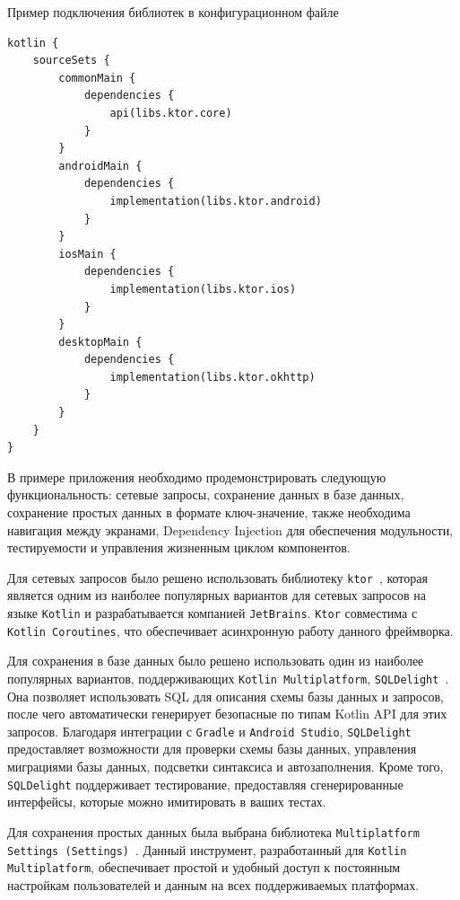\documentclass[14pt, russian]{scrartcl}
\begin{document}
\begin{listing}[!htb]
\caption{Пример подключения библиотек в конфигурационном файле}
\label{lst:apply-lib}
\begin{verbatim}
kotlin {
    sourceSets {
        commonMain {
            dependencies {
                api(libs.ktor.core)
            }
        }
        androidMain {
            dependencies {
                implementation(libs.ktor.android)
            }
        }
        iosMain {
            dependencies {
                implementation(libs.ktor.ios)
            }
        }
        desktopMain {
            dependencies {
                implementation(libs.ktor.okhttp)
            }
        }
    }
}
\end{verbatim}
\end{listing}

В примере приложения необходимо продемонстрировать следующую функциональность: сетевые запросы, сохранение данных в базе данных, сохранение простых данных в формате ключ-значение, также необходима навигация между экранами, Dependency Injection для обеспечения модульности, тестируемости и управления жизненным циклом компонентов.

Для сетевых запросов было решено использовать библиотеку \texttt{ktor}~\cite{ktor}, которая является одним из наиболее популярных вариантов для сетевых запросов на языке \texttt{Kotlin} и разрабатывается компанией \texttt{JetBrains}. \texttt{Ktor} совместима с \texttt{Kotlin Coroutines}, что обеспечивает асинхронную работу данного фреймворка.

Для сохранения в базе данных было решено использовать один из наиболее популярных вариантов, поддерживающих \texttt{Kotlin Multiplatform}, \texttt{SQLDelight}~\cite{sqldelight}. Она позволяет использовать SQL для описания схемы базы данных и запросов, после чего автоматически генерирует безопасные по типам Kotlin API для этих запросов. Благодаря интеграции с \texttt{Gradle} и \texttt{Android Studio}, \texttt{SQLDelight} предоставляет возможности для проверки схемы базы данных, управления миграциями базы данных, подсветки синтаксиса и автозаполнения. Кроме того, \texttt{SQLDelight} поддерживает тестирование, предоставляя сгенерированные интерфейсы, которые можно имитировать в ваших тестах.

Для сохранения простых данных была выбрана библиотека \texttt{Multiplatform Settings (Settings)}~\cite{mp-settings}. Данный инструмент, разработанный для \texttt{Kotlin Multiplatform}, обеспечивает простой и удобный доступ к постоянным настройкам пользователей и данным на всех поддерживаемых платформах.
\end{document}
